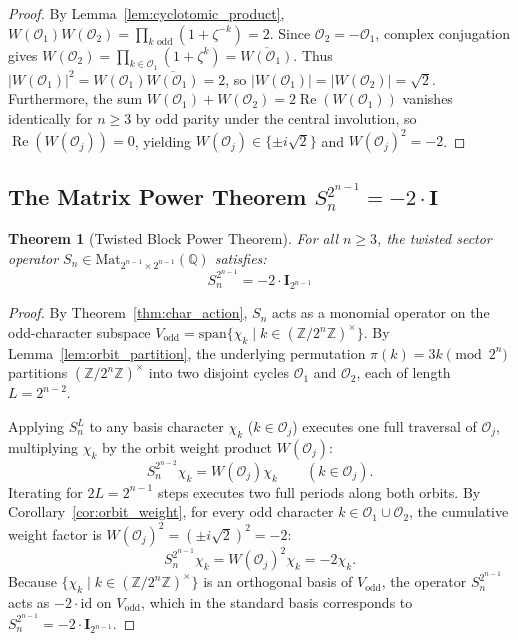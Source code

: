 \documentclass[11pt,reqno]{article}
\theoremstyle{plain}
\newtheorem{theorem}{Theorem}[section]
\theoremstyle{definition}
\theoremstyle{remark}
\newcommand{\Z}{\mathbb{Z}}
\newcommand{\Q}{\mathbb{Q}}
\newcommand{\id}{\mathrm{id}}
\begin{document}
\begin{proof}
By Lemma~\ref{lem:cyclotomic_product}, $W(\mathcal{O}_1) W(\mathcal{O}_2) = \prod_{k \text{ odd}} (1 + \zeta^{-k}) = 2$. Since $\mathcal{O}_2 = -\mathcal{O}_1$, complex conjugation gives $W(\mathcal{O}_2) = \prod_{k \in \mathcal{O}_1} (1 + \zeta^k) = \overline{W(\mathcal{O}_1)}$. Thus $|W(\mathcal{O}_1)|^2 = W(\mathcal{O}_1) \overline{W(\mathcal{O}_1)} = 2$, so $|W(\mathcal{O}_1)| = |W(\mathcal{O}_2)| = \sqrt{2}$. Furthermore, the sum $W(\mathcal{O}_1) + W(\mathcal{O}_2) = 2 \operatorname{Re}(W(\mathcal{O}_1))$ vanishes identically for $n \ge 3$ by odd parity under the central involution, so $\operatorname{Re}(W(\mathcal{O}_j)) = 0$, yielding $W(\mathcal{O}_j) \in \{\pm i \sqrt{2}\}$ and $W(\mathcal{O}_j)^2 = -2$.
\end{proof}

\subsection{The Matrix Power Theorem $S_n^{2^{n-1}} = -2 \cdot \mathbf{I}$}

\begin{theorem}[Twisted Block Power Theorem]
\label{thm:power_theorem}
For all $n \ge 3$, the twisted sector operator $S_n \in \mathrm{Mat}_{2^{n-1} \times 2^{n-1}}(\Q)$ satisfies:
\[
S_n^{2^{n-1}} = -2 \cdot \mathbf{I}_{2^{n-1}}
\]
\end{theorem}

\begin{proof}
By Theorem~\ref{thm:char_action}, $S_n$ acts as a monomial operator on the odd-character subspace $V_{\mathrm{odd}} = \mathrm{span}\{\chi_k \mid k \in (\Z/2^n\Z)^\times\}$. By Lemma~\ref{lem:orbit_partition}, the underlying permutation $\pi(k) = 3k \pmod{2^n}$ partitions $(\Z/2^n\Z)^\times$ into two disjoint cycles $\mathcal{O}_1$ and $\mathcal{O}_2$, each of length $L = 2^{n-2}$.

Applying $S_n^L$ to any basis character $\chi_k$ ($k \in \mathcal{O}_j$) executes one full traversal of $\mathcal{O}_j$, multiplying $\chi_k$ by the orbit weight product $W(\mathcal{O}_j)$:
\[
S_n^{2^{n-2}} \chi_k = W(\mathcal{O}_j) \chi_k \qquad (k \in \mathcal{O}_j).
\]
Iterating for $2L = 2^{n-1}$ steps executes two full periods along both orbits. By Corollary~\ref{cor:orbit_weight}, for every odd character $k \in \mathcal{O}_1 \cup \mathcal{O}_2$, the cumulative weight factor is $W(\mathcal{O}_j)^2 = (\pm i\sqrt{2})^2 = -2$:
\[
S_n^{2^{n-1}} \chi_k = W(\mathcal{O}_j)^2 \chi_k = -2 \chi_k.
\]
Because $\{\chi_k \mid k \in (\Z/2^n\Z)^\times\}$ is an orthogonal basis of $V_{\mathrm{odd}}$, the operator $S_n^{2^{n-1}}$ acts as $-2 \cdot \id$ on $V_{\mathrm{odd}}$, which in the standard basis corresponds to $S_n^{2^{n-1}} = -2 \cdot \mathbf{I}_{2^{n-1}}$.
\end{proof}
\end{document}
